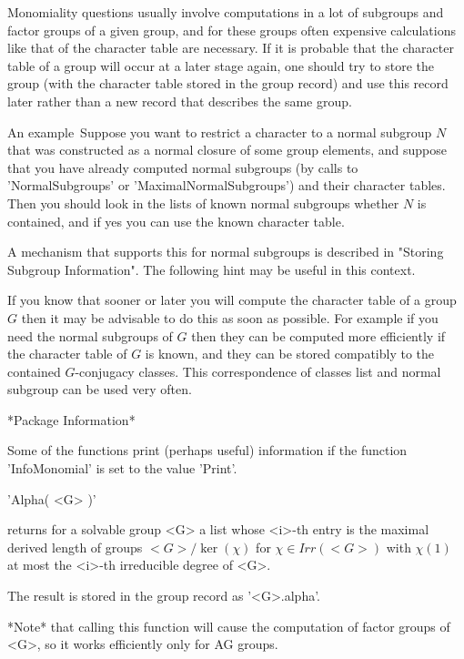 Monomiality questions usually involve computations in a lot of subgroups
and factor groups of a given group, and for these groups often expensive
calculations like that of the character table are necessary.
If it is probable that the character table of a group will occur at
a later stage again, one should try to store the group (with the character
table stored in the group record) and use this record later rather than
a new record that describes the same group.

An example\:\ Suppose you want to restrict a character to a normal subgroup
$N$ that was constructed as a normal closure of some group elements, and
suppose that you have already computed normal subgroups (by calls to
'NormalSubgroups' or 'MaximalNormalSubgroups') and their character tables.
Then you should look in the lists of known normal subgroups whether $N$ is
contained, and if yes you can use the known character table.

A mechanism that supports this for normal subgroups is described in
"Storing Subgroup Information".  The following hint may be useful in this
context.

If you know that sooner or later you will compute the character table of
a group $G$ then it may be advisable to do this as soon as possible.
For example if you need the normal subgroups of $G$ then they can be
computed more efficiently if the character table of $G$ is known, and they
can be stored compatibly to the contained $G$-conjugacy classes.
This correspondence of classes list and normal subgroup can be used very
often.

\vspace{5mm}

*Package Information*

Some of the functions print (perhaps useful) information if the
function 'InfoMonomial' is set to the value 'Print'.


'Alpha( <G> )'

returns for a solvable group <G> a list whose <i>-th entry is the maximal
derived length of groups $<G>  / \ker(\chi)$ for $\chi\in Irr(<G>)$ with
$\chi(1)$ at most the <i>-th irreducible degree of <G>.

The result is stored in the group record as '<G>.alpha'.

*Note* that calling this function will cause the computation of factor groups
of <G>, so it works efficiently only for AG groups.

